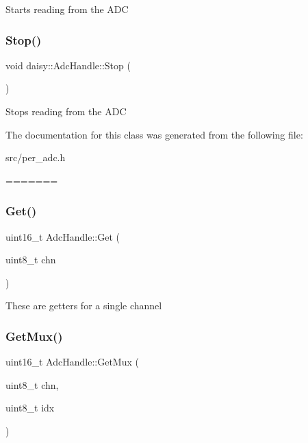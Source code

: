 Starts reading from the A\+DC \mbox{\label{classdaisy_1_1_adc_handle_ab6a016e484c9b7389e6302521e778bc9}} 
\subsubsection{\texorpdfstring{Stop()}{Stop()}}
{\footnotesize\ttfamily void daisy\+::\+Adc\+Handle\+::\+Stop (\begin{DoxyParamCaption}{ }\end{DoxyParamCaption})}

Stops reading from the A\+DC 

The documentation for this class was generated from the following file\+:\begin{DoxyCompactItemize}
\item 
src/per\+\_\+adc.\+h\end{DoxyCompactItemize}
=======
\mbox{\label{classdaisy_1_1_adc_handle_a3350141272ccbb34ec3f028a60c684ca}} 
\subsubsection{\texorpdfstring{Get()}{Get()}}
{\footnotesize\ttfamily uint16\+\_\+t Adc\+Handle\+::\+Get (\begin{DoxyParamCaption}\item[{uint8\+\_\+t}]{chn }\end{DoxyParamCaption})}

These are getters for a single channel \mbox{\label{classdaisy_1_1_adc_handle_ae1cc9052337f727e7f5e32cdc3cb3602}} 
\subsubsection{\texorpdfstring{Get\+Mux()}{GetMux()}}
{\footnotesize\ttfamily uint16\+\_\+t Adc\+Handle\+::\+Get\+Mux (\begin{DoxyParamCaption}\item[{uint8\+\_\+t}]{chn,  }\item[{uint8\+\_\+t}]{idx }\end{DoxyParamCaption})}

